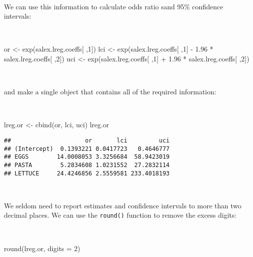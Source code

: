 \documentclass[
  12pt,
  a4paper]{book}
\newenvironment{Shaded}{\begin{snugshade}}{\end{snugshade}}
\newcommand{\AttributeTok}[1]{\textcolor[rgb]{0.77,0.63,0.00}{#1}}
\newcommand{\DecValTok}[1]{\textcolor[rgb]{0.00,0.00,0.81}{#1}}
\newcommand{\FloatTok}[1]{\textcolor[rgb]{0.00,0.00,0.81}{#1}}
\newcommand{\FunctionTok}[1]{\textcolor[rgb]{0.00,0.00,0.00}{#1}}
\newcommand{\NormalTok}[1]{#1}
\newcommand{\OtherTok}[1]{\textcolor[rgb]{0.56,0.35,0.01}{#1}}
\newcommand{\SpecialCharTok}[1]{\textcolor[rgb]{0.00,0.00,0.00}{#1}}
\begin{document}
~

We can use this information to calculate odds ratio sand 95\% confidence intervals:

~

\begin{Shaded}
\begin{Highlighting}[]
\NormalTok{or }\OtherTok{\textless{}{-}} \FunctionTok{exp}\NormalTok{(salex.lreg.coeffs[ ,}\DecValTok{1}\NormalTok{])}
\NormalTok{lci }\OtherTok{\textless{}{-}} \FunctionTok{exp}\NormalTok{(salex.lreg.coeffs[ ,}\DecValTok{1}\NormalTok{] }\SpecialCharTok{{-}} \FloatTok{1.96} \SpecialCharTok{*}\NormalTok{ salex.lreg.coeffs[ ,}\DecValTok{2}\NormalTok{])}
\NormalTok{uci }\OtherTok{\textless{}{-}} \FunctionTok{exp}\NormalTok{(salex.lreg.coeffs[ ,}\DecValTok{1}\NormalTok{] }\SpecialCharTok{+} \FloatTok{1.96} \SpecialCharTok{*}\NormalTok{ salex.lreg.coeffs[ ,}\DecValTok{2}\NormalTok{])}
\end{Highlighting}
\end{Shaded}

~

and make a single object that contains all of the required information:

~

\begin{Shaded}
\begin{Highlighting}[]
\NormalTok{lreg.or }\OtherTok{\textless{}{-}} \FunctionTok{cbind}\NormalTok{(or, lci, uci)}
\NormalTok{lreg.or}
\end{Highlighting}
\end{Shaded}

\begin{verbatim}
##                     or       lci         uci
## (Intercept)  0.1393221 0.0417723   0.4646777
## EGGS        14.0008053 3.3256684  58.9423019
## PASTA        5.2834608 1.0231552  27.2832114
## LETTUCE     24.4246856 2.5559581 233.4018193
\end{verbatim}

~

We seldom need to report estimates and confidence intervals to more than two decimal places. We can use the \texttt{round()} function to remove the excess digits:

~

\begin{Shaded}
\begin{Highlighting}[]
\FunctionTok{round}\NormalTok{(lreg.or, }\AttributeTok{digits =} \DecValTok{2}\NormalTok{)}
\end{Highlighting}
\end{Shaded}
\end{document}
